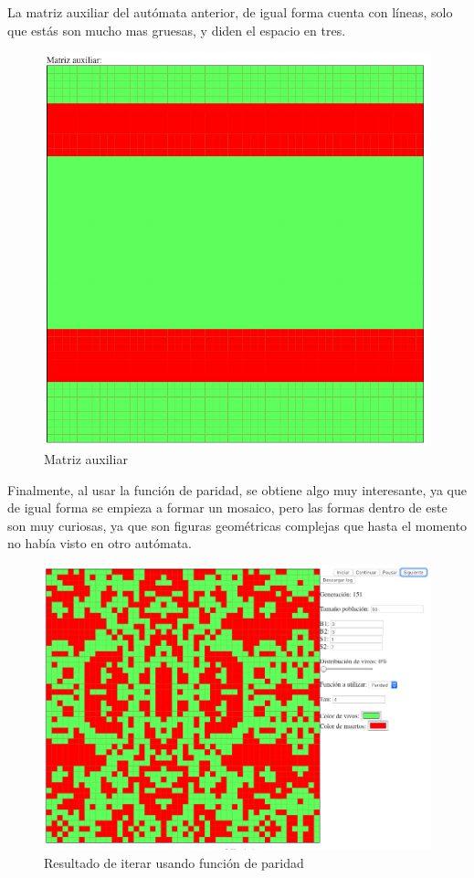 	La matriz auxiliar del autómata anterior, de igual forma cuenta con líneas, solo que estás son mucho mas gruesas, y diden el espacio en tres.
	\begin{figure}[H]
		\begin{center}
			\includegraphics[scale=.3]{GOLM/img/regla3317-2-1.png}
			\caption{Matriz auxiliar}
			\label{fig:golm33}
		\end{center}
	\end{figure}

	Finalmente, al usar la función de paridad, se obtiene algo muy interesante, ya que de igual forma se empieza a formar un mosaico, pero las formas dentro de este son muy curiosas, ya que son figuras geométricas complejas que hasta el momento no había visto en otro autómata.
	\begin{figure}[H]
		\begin{center}
			\includegraphics[scale=.3]{GOLM/img/regla3317-3.png}
			\caption{Resultado de iterar usando función de paridad}
			\label{fig:golm34}
		\end{center}
	\end{figure}

